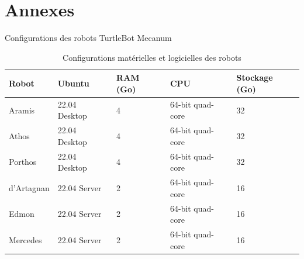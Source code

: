 \section{Annexes}




\begin{frame}{Configurations des robots TurtleBot Mecanum}
    \small
    \begin{table}
    \centering
    \caption{Configurations matérielles et logicielles des robots}
    \begin{tabular}{|l|l|l|l|l|}
      \hline
      Robot & Ubuntu & RAM (Go) & CPU & Stockage (Go) \\
      \hline
      Aramis & 22.04 Desktop & 4 & 64-bit quad-core & 32 \\
      Athos & 22.04 Desktop & 4 & 64-bit quad-core & 32 \\
      Porthos & 22.04 Desktop & 4 & 64-bit quad-core & 32 \\
      d'Artagnan & 22.04 Server & 2 & 64-bit quad-core & 16 \\
      Edmon & 22.04 Server & 2 & 64-bit quad-core & 16 \\
      Mercedes & 22.04 Server & 2 & 64-bit quad-core & 16 \\
      \hline
    \end{tabular}
    \end{table}
  \end{frame}
  



